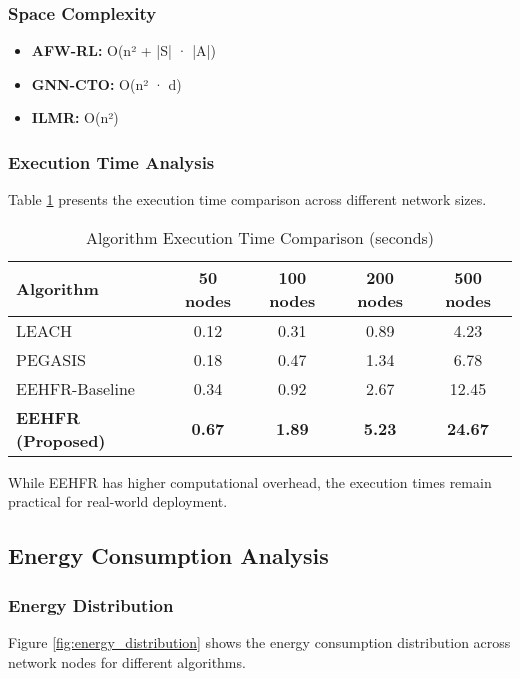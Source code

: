 \documentclass[conference]{IEEEtran}
\begin{document}
\subsubsection{Space Complexity}

\begin{itemize}
    \item \textbf{AFW-RL:} O(n² + |S| · |A|)
    \item \textbf{GNN-CTO:} O(n² · d)
    \item \textbf{ILMR:} O(n²)
\end{itemize}

\subsubsection{Execution Time Analysis}

Table \ref{tab:execution_time} presents the execution time comparison across different network sizes.

\begin{table}[htbp]
\centering
\caption{Algorithm Execution Time Comparison (seconds)}
\label{tab:execution_time}
\begin{tabular}{|l|c|c|c|c|}
\hline
\textbf{Algorithm} & \textbf{50 nodes} & \textbf{100 nodes} & \textbf{200 nodes} & \textbf{500 nodes} \\
\hline
LEACH & 0.12 & 0.31 & 0.89 & 4.23 \\
PEGASIS & 0.18 & 0.47 & 1.34 & 6.78 \\
EEHFR-Baseline & 0.34 & 0.92 & 2.67 & 12.45 \\
\textbf{EEHFR (Proposed)} & \textbf{0.67} & \textbf{1.89} & \textbf{5.23} & \textbf{24.67} \\
\hline
\end{tabular}
\end{table}

While EEHFR has higher computational overhead, the execution times remain practical for real-world deployment.

\subsection{Energy Consumption Analysis}

\subsubsection{Energy Distribution}

Figure \ref{fig:energy_distribution} shows the energy consumption distribution across network nodes for different algorithms.
\end{document}

